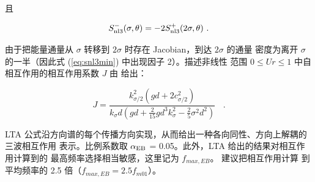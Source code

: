 \noindent
且

\begin{equation}
  S^-_{\rm nl3} (\sigma,\theta) = -2 S^+_{\rm nl3} (2\sigma,\theta)\  .
  \label{eq:snl3min}
\end{equation}

\noindent
由于把能量通量从 $\sigma$ 转移到 $2\sigma$ 时存在 Jacobian，到达 $2\sigma$ 的通量
密度为离开 $\sigma$ 的一半（因此式 (\ref{eq:snl3min}) 中出现因子 2）。描述非线性
范围 $0 \leq Ur \leq 1$ 中自相互作用的相互作用系数 $J$ 由 \citep{art:MS93} 给出：

\begin{equation}
   J = \frac{k^2_{\sigma/2} (gd + 2 c^2_{\sigma/2})}
      {k_\sigma d (gd + \frac{2}{15} gd^3 k^2_\sigma - \frac{2}{5} \sigma^2
        d^2)}\ \:\:\:  .
   \label{eq:intcoef}
\end{equation}

\noindent
LTA 公式沿方向谱的每个传播方向实现，从而给出一种各向同性、方向上解耦的三波相互作用
表示。比例系数取 $\alpha_{\rm EB}$ = 0.05。此外，LTA 给出的结果对相互作用计算到的
最高频率选择相当敏感，这里记为 $f_{max,EB}$。\citep{rep:Eld95} 建议把相互作用计算
到平均频率的 2.5 倍（$f_{max,EB} = 2.5 f_{m01}$）。
